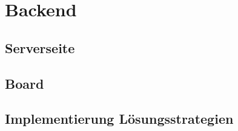 
\chapter{Backend}

\section{Serverseite}

\section{Board}

\section{Implementierung Lösungsstrategien}